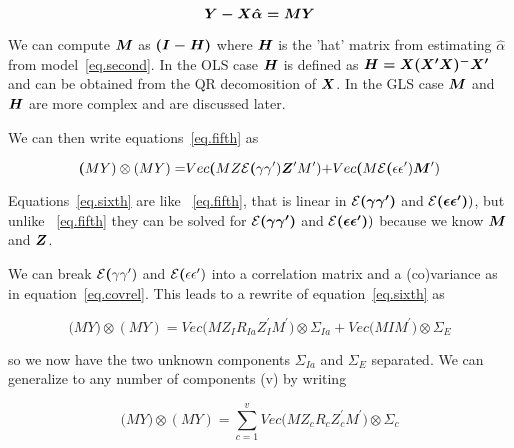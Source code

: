 \documentclass[titlepage]{article}  %
\begin{document}
\begin{displaymath}
\mbox{\boldmath $Y - X \hat{\alpha} = M Y$}
\end{displaymath}

We can compute $\mbox{\boldmath $M$}$ as $\mbox{\boldmath $(I - H)$}$ where $\mbox{\boldmath $H$}$ is the 'hat' matrix from estimating $\hat{\alpha}$ from model~\ref{eq.second}. In the OLS case $\mbox{\boldmath $H$}$ is defined as $\mbox{\boldmath $H = X(X^{\prime}X)^{-}X^{\prime}$}$ and can be obtained from the QR decomosition of $\mbox{\boldmath $X$}$. In the GLS case $\mbox{\boldmath $M$}$ and $\mbox{\boldmath $H$}$ are more complex and are discussed later.

We can then write equations~\ref{eq.fifth} as

\begin{equation}
{\bm (MY)\otimes(MY) = } Vec{\bm (MZ}{\cal E}{\bm (\gamma \gamma^{\prime}){\bm Z^{\prime}M^{\prime})}  + } Vec{\bm (M}{\cal E}{\bm (\epsilon \epsilon^{\prime})}{\bm M^{\prime})}     \label{eq.sixth}
\end{equation}
 
Equations~\ref{eq.sixth} are like ~\ref{eq.fifth}, that is linear in ${\cal E}\mbox{\boldmath $(\gamma \gamma^{\prime})$}$ and ${\cal E}\mbox{\boldmath $(\epsilon \epsilon^{\prime})$})$, but unlike ~\ref{eq.fifth} they can be solved for ${\cal E}\mbox{\boldmath $(\gamma \gamma^{\prime})$}$ and ${\cal E}\mbox{\boldmath $(\epsilon \epsilon^{\prime})$})$ because we know $\mbox{\boldmath $M$}$ and $\mbox{\boldmath $Z$}$. 

We can break ${\cal E}{\bm (\gamma \gamma^{\prime})}$ and ${\cal E}{\bm (\epsilon \epsilon^{\prime})}$ into a correlation matrix and a (co)variance as in equation~\ref{eq.covrel}. This leads to a rewrite of equation~\ref{eq.sixth} as

\begin{equation}
{\bm (MY)\otimes(MY) = } Vec{\bm (MZ_{I} R_{Ia} Z_{I}^{\prime}M^{\prime}) \otimes \Sigma_{Ia}  + } Vec{\bm (M I M^{\prime}) \otimes \Sigma_{E}}     \label{eq.sixa}
\end{equation}

so we now have the two unknown components $\Sigma_{Ia}$ and $\Sigma_{E}$ separated. We can generalize to any number of components (v) by writing

\begin{equation}
{\bm (MY)\otimes(MY) = } \sum_{c=1}^{v} Vec{\bm (MZ_{c} R_{c} Z_{c}^{\prime}M^{\prime}) \otimes \Sigma_{c}}       \label{eq.sixb}
\end{equation}
\end{document}
